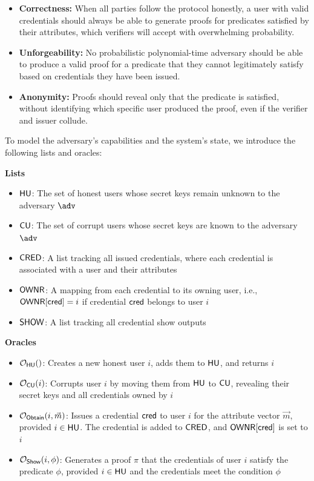 \begin{itemize}
    \item \textbf{Correctness:} When all parties follow the protocol honestly, a user with valid credentials should always be able to generate proofs for predicates satisfied by their attributes, which verifiers will accept with overwhelming probability.
    
    \item \textbf{Unforgeability:} No probabilistic polynomial-time adversary should be able to produce a valid proof for a predicate that they cannot legitimately satisfy based on credentials they have been issued.
    
    \item \textbf{Anonymity:} Proofs should reveal only that the predicate is satisfied, without identifying which specific user produced the proof, even if the verifier and issuer collude.
\end{itemize}

To model the adversary's capabilities and the system's state, we introduce the following lists and oracles:

\noindent\textbf{Lists}
\begin{itemize}
    \item $\mathsf{HU}$: The set of honest users whose secret keys remain unknown to the adversary $\adv$
    \item $\mathsf{CU}$: The set of corrupt users whose secret keys are known to the adversary $\adv$
    \item $\mathsf{CRED}$: A list tracking all issued credentials, where each credential is associated with a user and their attributes
    \item $\mathsf{OWNR}$: A mapping from each credential to its owning user, i.e., $\mathsf{OWNR}[\mathsf{cred}] = i$ if credential $\mathsf{cred}$ belongs to user $i$
    \item $\mathsf{SHOW}$: A list tracking all credential show outputs
\end{itemize} 

\noindent\textbf{Oracles}
\begin{itemize}
    \item $\mathcal{O}_{\mathsf{HU}}()$: Creates a new honest user $i$, adds them to $\mathsf{HU}$, and returns $i$
    \item $\mathcal{O}_{\mathsf{CU}}(i)$: Corrupts user $i$ by moving them from $\mathsf{HU}$ to $\mathsf{CU}$, revealing their secret keys and all credentials owned by $i$
    \item $\mathcal{O}_{\mathsf{Obtain}}(i, \vec{m})$: Issues a credential $\mathsf{cred}$ to user $i$ for the attribute vector $\vec{m}$, provided $i \in \mathsf{HU}$. The credential is added to $\mathsf{CRED}$, and $\mathsf{OWNR}[\mathsf{cred}]$ is set to $i$
    \item $\mathcal{O}_{\mathsf{Show}}(i, \phi)$: Generates a proof $\pi$ that the credentials of user $i$ satisfy the predicate $\phi$, provided $i \in \mathsf{HU}$ and the credentials meet the condition $\phi$
\end{itemize} 

